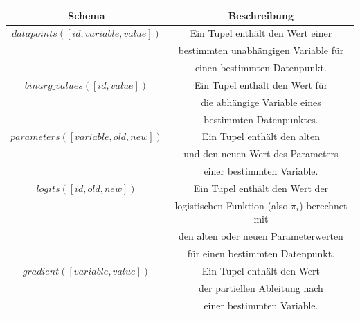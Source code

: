 \begin{center}
  \begin{tabular}{|c|c|}\hline
    \textbf{Schema} & \textbf{Beschreibung} \\ \hline
    $datapoints([id, variable, value])$ & Ein Tupel enthält den Wert einer \\
    & bestimmten unabhängigen Variable für \\
    & einen bestimmten Datenpunkt. \\ \hline
    $binary\_values([id, value])$ & Ein Tupel enthält den Wert für \\
    & die abhängige Variable eines \\
    & bestimmten Datenpunktes. \\ \hline
    $parameters([variable, old, new])$ & Ein Tupel enthält den alten \\
    & und den neuen Wert des Parameters \\
    & einer bestimmten Variable. \\ \hline
    $logits([id, old, new])$ & Ein Tupel enthält den Wert der \\
    & logistischen Funktion (also $\pi_i$) berechnet mit \\
    & den alten oder neuen Parameterwerten \\
    & für einen bestimmten Datenpunkt. \\ \hline
    $gradient([variable, value])$ & Ein Tupel enthält den Wert \\
    & der partiellen Ableitung nach \\
    & einer bestimmten Variable. \\ \hline
  \end{tabular}
\end{center}

